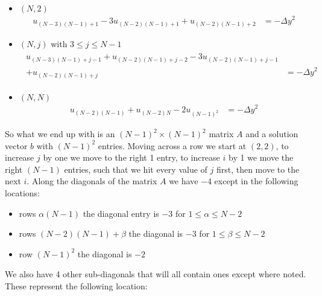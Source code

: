 \documentclass[11pt]{article}
\begin{document}
\begin{itemize}
\begin{align*}
\begin{split}
			\end{split}
		\end{align*}
		\item $ (N,2) $
		\begin{align*}
			u_{(N-3)(N-1)+1} - 3u_{(N-2)(N-1)+1} + u_{(N-2)(N-1)+2} &= -{\Delta y}^2
		\end{align*}
		\item $ (N,j) $ with $ 3\leq j\leq N-1 $
		\begin{align*}
			\begin{split}
				u_{(N-3)(N-1)+j-1} + u_{(N-2)(N-1)+j-2} - 3u_{(N-2)(N-1)+j-1}\\ + u_{(N-2)(N-1)+j} &= -{\Delta y}^2
			\end{split}
		\end{align*}
		\item $ (N,N) $
		\begin{align*}
			u_{(N-2)(N-1)} + u_{(N-2)N} - 2u_{(N-1)^2} &= -{\Delta y}^2
		\end{align*}
	\end{itemize}
	So what we end up with is an $ (N-1)^2\times(N-1)^2 $ matrix $ A $ and a solution vector $ b $ with $ (N-1)^2 $ entries. Moving across a row we start at $ (2,2) $, to increase $ j $ by one we move to the right 1 entry, to increase $ i $ by 1 we move the right $ (N-1) $ entries, such that we hit every value of $ j $ first, then move to the next $ i $.
	\newline\indent Along the diagonals of the matrix $ A $ we have $ -4 $ except in the following locations:
	\begin{itemize}
		\item rows $ \alpha(N-1) $ the diagonal entry is $ -3 $ for $ 1\leq \alpha\leq N-2 $
		\item rows $ \left(N-2\right)\left(N-1\right)+\beta $ the diagonal is $ -3 $ for $ 1\leq\beta\leq N-2 $
		\item row $ \left(N-1\right)^2 $ the diagonal is $ -2 $
	\end{itemize}
	We also have 4 other sub-diagonals that will all contain ones except where noted. These represent the following location:
\end{document}
